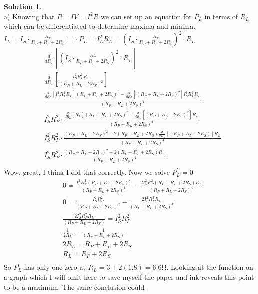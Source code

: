 \documentclass[10pt]{article}
\theoremstyle{definition}
\newtheorem{soln}{Solution}
\begin{document}
\begin{soln} ~\\
  a) Knowing that $P=IV=I^2R$ we can set up an equation for $P_{L}$ in terms of $R_{L}$ which can be differentiated to determine maxima and minima. 
  $I_L=I_S\cdot\displaystyle\frac{R_P}{R_P+R_L+2R_S}\implies P_L=I_L^2R_L=\left(I_S\cdot\frac{R_P}{R_P+R_L+2R_S}\right)^2\cdot R_L$
  \begin{align*}
   & \frac{d}{dR_L}\left[\left(I_S\cdot\frac{R_P}{R_P+R_L+2R_S}\right)^2\cdot R_L\right] \\
   & \frac{d}{dR_L}\left[\frac{I_S^2R_P^2R_L}{\left(R_P+R_L+2R_S\right)^2} \right] \\
   & \frac{\frac{d}{dR_L}\left[I_S^2R_P^2R_L\right]\left(R_P+R_L+2R_S\right)^2-\frac{d}{dR_L}\left[\left(R_P+R_L+2R_S\right)^2\right]I_S^2R_P^2R_L}{\left(R_P+R_L+2R_S\right)^4} \\
   & I_S^2R_P^2\cdot\frac{\frac{d}{dR_L}\left[R_L\right]\left(R_P+R_L+2R_S\right)^2-\frac{d}{dR_L}\left[\left(R_P+R_L+2R_S\right)^2\right]R_L}{\left(R_P+R_L+2R_S\right)^4} \\
   & I_S^2R_P^2\cdot\frac{\left(R_P+R_L+2R_S\right)^2-2\left(R_P+R_L+2R_S\right)\frac{d}{dR_L}\left[\left(R_P+R_L+2R_S\right)\right]R_L}{\left(R_P+R_L+2R_S\right)^4} \\
   & I_S^2R_P^2\cdot\frac{\left(R_P+R_L+2R_S\right)^2-2\left(R_P+R_L+2R_S\right)R_L}{\left(R_P+R_L+2R_S\right)^4} \\
  \end{align*}
  Wow, great, I think I did that correctly. Now we solve $P_L^\prime=0$
  \begin{align*}
    & 0 = \frac{I_S^2R_P^2\left(R_P+R_L+2R_S\right)^2}{\left(R_P+R_L+2R_S\right)^4} - \frac{2I_S^2R_P^2\left(R_P+R_L+2R_S\right)R_L}{\left(R_P+R_L+2R_S\right)^4}\\
    & 0 = \frac{I_S^2R_P^2}{\left(R_P+R_L+2R_S\right)^2} - \frac{2I_S^2R_P^2R_L}{\left(R_P+R_L+2R_S\right)^3} \\
    & \frac{2I_S^2R_P^2R_L}{\left(R_P+R_L+2R_S\right)} = I_S^2R_P^2\\
    & \frac{1}{2R_L} = \frac{1}{\left(R_P+R_L+2R_S\right)} \\
    & 2R_L = R_P+R_L+2R_S \\
    & R_L = R_P+2R_S \\
   \end{align*}
   So $P_L^\prime$ has only one zero at $R_L = 3+2(1.8)=6.6\unit{\ohm}$. Looking at the function on a graph which I will omit here to save myself the paper and ink reveals this point to be a maximum. The same conclusion could

\end{soln}
\end{document}

